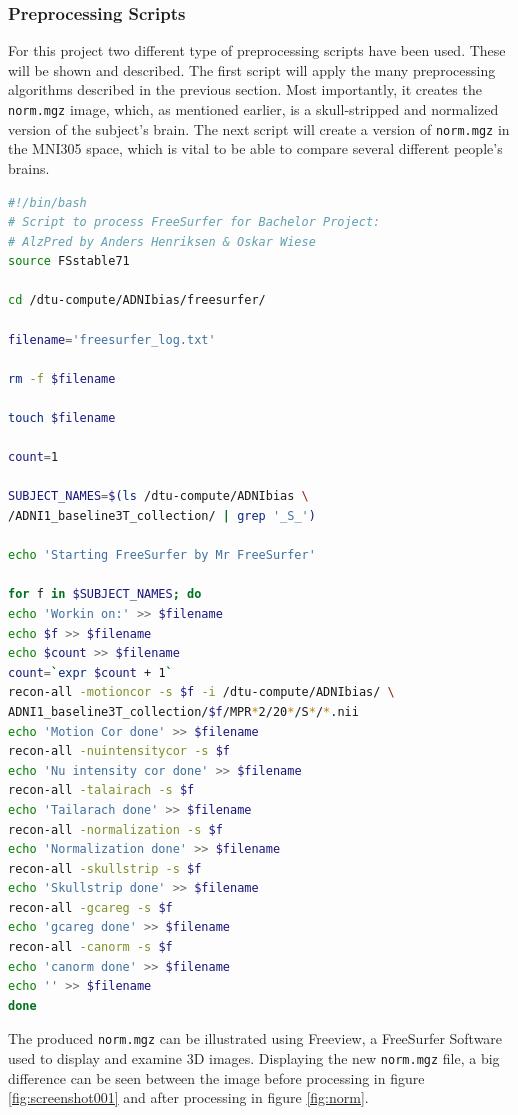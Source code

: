 \documentclass[12pt, fleqn, titlepage]{article}
\begin{document}
\subsubsection{Preprocessing Scripts}
For this project two different type of preprocessing scripts have been used. These will be shown and described. The first script will apply the many preprocessing algorithms described in the previous section. Most importantly, it creates the \texttt{norm.mgz} image, which, as mentioned earlier, is a skull-stripped and normalized version of the subject's brain. The next script will create a version of \texttt{norm.mgz} in the MNI305 space, which is vital to be able to compare several different people's brains.

\begin{lstlisting}[language=bash,caption={FreeSurfer Preprocessing}]
#!/bin/bash 
# Script to process FreeSurfer for Bachelor Project:
# AlzPred by Anders Henriksen & Oskar Wiese
source FSstable71

cd /dtu-compute/ADNIbias/freesurfer/

filename='freesurfer_log.txt'

rm -f $filename

touch $filename

count=1

SUBJECT_NAMES=$(ls /dtu-compute/ADNIbias \ 
/ADNI1_baseline3T_collection/ | grep '_S_')

echo 'Starting FreeSurfer by Mr FreeSurfer' 

for f in $SUBJECT_NAMES; do
echo 'Workin on:' >> $filename
echo $f >> $filename
echo $count >> $filename 
count=`expr $count + 1`
recon-all -motioncor -s $f -i /dtu-compute/ADNIbias/ \
ADNI1_baseline3T_collection/$f/MPR*2/20*/S*/*.nii 
echo 'Motion Cor done' >> $filename
recon-all -nuintensitycor -s $f  
echo 'Nu intensity cor done' >> $filename
recon-all -talairach -s $f 
echo 'Tailarach done' >> $filename
recon-all -normalization -s $f 
echo 'Normalization done' >> $filename
recon-all -skullstrip -s $f     
echo 'Skullstrip done' >> $filename
recon-all -gcareg -s $f  
echo 'gcareg done' >> $filename
recon-all -canorm -s $f  
echo 'canorm done' >> $filename
echo '' >> $filename
done 
\end{lstlisting}

\noindent
The produced \texttt{norm.mgz} can be illustrated using Freeview, a FreeSurfer Software used to display and examine 3D images. Displaying the new \texttt{norm.mgz} file, a big difference can be seen between the image before processing in figure \ref{fig:screenshot001} and after processing in figure \ref{fig:norm}.
\end{document}
